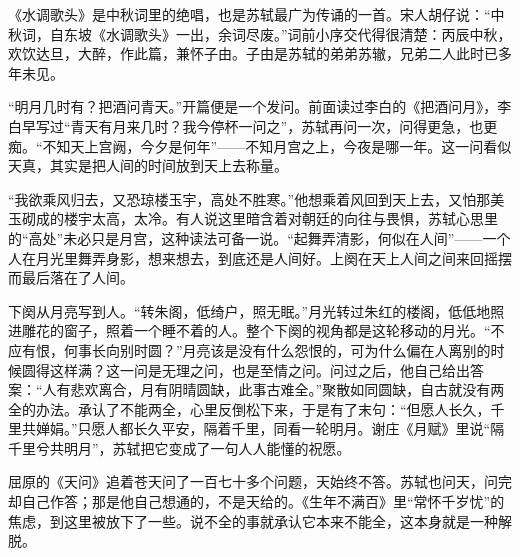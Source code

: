\begin{appreciation}
《水调歌头》是中秋词里的绝唱，也是苏轼最广为传诵的一首。宋人胡仔说：“中秋词，自东坡《水调歌头》一出，余词尽废。”词前小序交代得很清楚：丙辰中秋，欢饮达旦，大醉，作此篇，兼怀子由。子由是苏轼的弟弟苏辙，兄弟二人此时已多年未见。

“明月几时有？把酒问青天。”开篇便是一个发问。前面读过李白的《把酒问月》，李白早写过“青天有月来几时？我今停杯一问之”，苏轼再问一次，问得更急，也更痴。“不知天上宫阙，今夕是何年”——不知月宫之上，今夜是哪一年。这一问看似天真，其实是把人间的时间放到天上去称量。

“我欲乘风归去，又恐琼楼玉宇，高处不胜寒。”他想乘着风回到天上去，又怕那美玉砌成的楼宇太高，太冷。有人说这里暗含着对朝廷的向往与畏惧，苏轼心思里的“高处”未必只是月宫，这种读法可备一说。“起舞弄清影，何似在人间”——一个人在月光里舞弄身影，想来想去，到底还是人间好。上阕在天上人间之间来回摇摆而最后落在了人间。

下阕从月亮写到人。“转朱阁，低绮户，照无眠。”月光转过朱红的楼阁，低低地照进雕花的窗子，照着一个睡不着的人。整个下阕的视角都是这轮移动的月光。“不应有恨，何事长向别时圆？”月亮该是没有什么怨恨的，可为什么偏在人离别的时候圆得这样满？这一问是无理之问，也是至情之问。问过之后，他自己给出答案：“人有悲欢离合，月有阴晴圆缺，此事古难全。”聚散如同圆缺，自古就没有两全的办法。承认了不能两全，心里反倒松下来，于是有了末句：“但愿人长久，千里共婵娟。”只愿人都长久平安，隔着千里，同看一轮明月。谢庄《月赋》里说“隔千里兮共明月”，苏轼把它变成了一句人人能懂的祝愿。

屈原的《天问》追着苍天问了一百七十多个问题，天始终不答。苏轼也问天，问完却自己作答；那是他自己想通的，不是天给的。《生年不满百》里“常怀千岁忧”的焦虑，到这里被放下了一些。说不全的事就承认它本来不能全，这本身就是一种解脱。
\end{appreciation}
